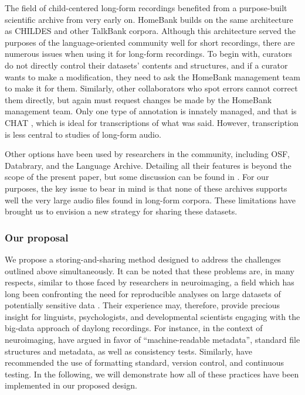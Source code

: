 \documentclass[smallextended]{svjour3}       %
\begin{document}
The field of child-centered long-form recordings benefited from a purpose-built scientific archive from very early on. HomeBank \cite{vandam2016homebank} builds on the same architecture as CHILDES \cite{MacWhinney2000} and other TalkBank corpora. Although this architecture served the purposes of the language-oriented community well for short recordings, there are numerous issues when using it for long-form recordings. To begin with, curators do not directly control their datasets' contents and structures, and if a curator wants to make a modification, they need to ask the HomeBank management team to make it for them. Similarly, other collaborators who spot errors cannot correct them directly, but again must request changes be made by the HomeBank management team.  Only one type of annotation is innately managed, and that is CHAT \cite{MacWhinney2000}, which is ideal for transcriptions of what was said. However, transcription is less central to studies of long-form audio.

Other options have been used by researchers in the community, including OSF, Databrary, and the Language Archive. Detailing all their features is beyond the scope of the present paper, but some discussion can be found in \cite{casillas2019step}. For our purposes, the key issue to bear in mind is that none of these archives supports well the very large audio files found in long-form corpora. These limitations have brought us to envision a new strategy for sharing these datasets. 

 \subsubsection*{Our proposal}
 
We propose a storing-and-sharing method designed to address the challenges outlined above simultaneously. It can be noted that these problems are, in many respects, similar to those faced by researchers in neuroimaging, a field which has long been confronting the need for reproducible analyses on large datasets of potentially sensitive data \citep{Poldrack2014}.
Their experience may, therefore, provide precious insight for linguists, psychologists, and developmental scientists engaging with the big-data approach of daylong recordings.
For instance, in the context of neuroimaging, \citet{Gorgolewski2016} have argued in favor of ``machine-readable metadata'', standard file structures and metadata, as well as consistency tests. Similarly, \citet{Eglen2017} have recommended the use of formatting standard, version control, and continuous testing. In the following, we will demonstrate how all of these practices have been implemented in our proposed design.
\end{document}
